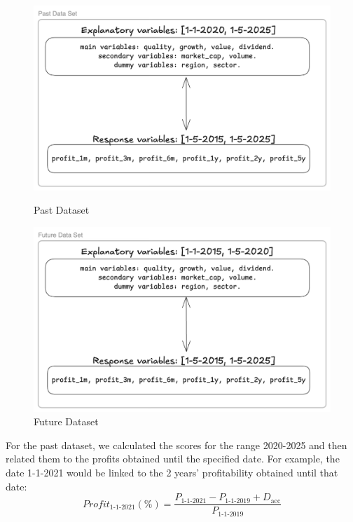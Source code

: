 \documentclass[11pt,english,a4paper,hidelinks]{book}
\begin{document}
\begin{figure}[H]
    \begin{minipage}{0.48\textwidth}
        \centering
        \includegraphics[width=\textwidth]{images/tweenvest/Past Dataset variables relations.png}
        \caption{Past Dataset}
        \label{fig:past_dataset}
    \end{minipage}
    \hfill
    \begin{minipage}{0.48\textwidth}
        \centering
        \includegraphics[width=\textwidth]{images/tweenvest/Future Dataset variables relations.png}
        \caption{Future Dataset}
        \label{fig:future_dataset}
    \end{minipage}
\end{figure}

\noindent For the past dataset, we calculated the scores for the range 2020-2025 and then related them to the profits obtained until the specified date. For example, the date 1-1-2021 would be linked to the 2 years' profitability obtained until that date: 
\begin{equation}
    Profit_{1\text{-}1\text{-}2021}(\%) = \frac{P_{1\text{-}1\text{-}2021} - P_{1\text{-}1\text{-}2019} + D_{\text{acc}}}{P_{1\text{-}1\text{-}2019}}
\end{equation}
\end{document}
